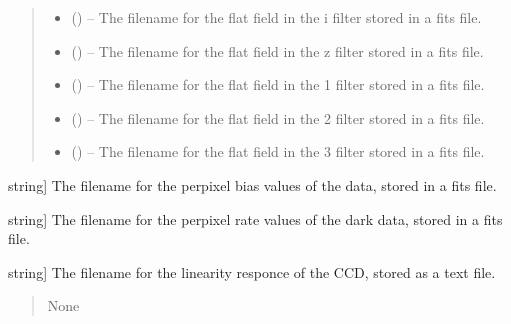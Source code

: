 \documentclass[letterpaper,11pt,english]{sphinxmanual}
\begin{document}
\begin{savenotes}
\begin{fulllineitems}
\begin{savenotes}
\begin{fulllineitems}
\begin{quote}
\begin{description}
\begin{itemize}
\item {} 
\sphinxAtStartPar
{} () – The filename for the flat field in the i filter stored in a
fits file.

\item {} 
\sphinxAtStartPar
{} () – The filename for the flat field in the z filter stored in a
fits file.

\item {} 
\sphinxAtStartPar
{} () – The filename for the flat field in the 1 filter stored in a
fits file.

\item {} 
\sphinxAtStartPar
{} () – The filename for the flat field in the 2 filter stored in a
fits file.

\item {} 
\sphinxAtStartPar
{} () – The filename for the flat field in the 3 filter stored in a
fits file.

\end{itemize}

\end{description}\end{quote}
\begin{description}
\sphinxlineitem{bias\_fits\_filename}{[}string{]}
\sphinxAtStartPar
The filename for the per\sphinxhyphen{}pixel bias values of the data,
stored in a fits file.

\sphinxlineitem{dark\_current\_fits\_filename}{[}string{]}
\sphinxAtStartPar
The filename for the per\sphinxhyphen{}pixel rate values of the dark data,
stored in a fits file.

\sphinxlineitem{linearity\_fits\_filename}{[}string{]}
\sphinxAtStartPar
The filename for the linearity responce of the CCD, stored as a
text file.

\end{description}
\begin{quote}\begin{description}
\sphinxAtStartPar
None


\end{description}
\end{quote}
\end{fulllineitems}
\end{savenotes}
\end{fulllineitems}
\end{savenotes}
\end{document}
